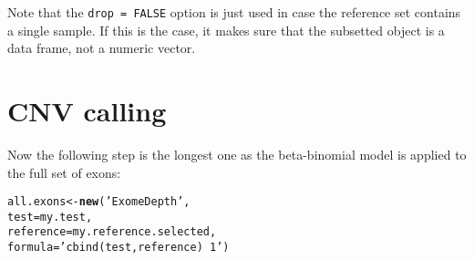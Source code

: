 \documentclass[10pt]{article}\usepackage[]{graphicx}\usepackage[]{color}
\makeatletter
\newcommand{\hlstr}[1]{\textcolor[rgb]{0.192,0.494,0.8}{#1}}%
\newcommand{\hlstd}[1]{\textcolor[rgb]{0.345,0.345,0.345}{#1}}%
\newcommand{\hlkwb}[1]{\textcolor[rgb]{0.69,0.353,0.396}{#1}}%
\newcommand{\hlkwc}[1]{\textcolor[rgb]{0.333,0.667,0.333}{#1}}%
\newcommand{\hlkwd}[1]{\textcolor[rgb]{0.737,0.353,0.396}{\textbf{#1}}}%
\newenvironment{kframe}{%
 \def\at@end@of@kframe{}%
 \ifinner\ifhmode%
  \def\at@end@of@kframe{\end{minipage}}%
  \begin{minipage}{\columnwidth}%
 \fi\fi%
 \def\FrameCommand##1{\hskip\@totalleftmargin \hskip-\fboxsep
 \colorbox{shadecolor}{##1}\hskip-\fboxsep
     \hskip-\linewidth \hskip-\@totalleftmargin \hskip\columnwidth}%
 \MakeFramed {\advance\hsize-\width
   \@totalleftmargin\z@ \linewidth\hsize
   \@setminipage}}%
 {\par\unskip\endMakeFramed%
 \at@end@of@kframe}
\newenvironment{knitrout}{}{} %
\makeatother
\begin{document}
Note that the \texttt{drop = FALSE} option is just used in case the reference set contains a single sample. 
If this is the case, it makes sure that the subsetted object is a data frame, not a numeric vector.

\section{CNV calling}
Now the following step is the longest one as the beta-binomial model is applied to the full set of exons:
\begin{knitrout}
\color{fgcolor}\begin{kframe}
\begin{alltt}
\hlstd{all.exons} \hlkwb{<-} \hlkwd{new}\hlstd{(}\hlstr{'ExomeDepth'}\hlstd{,}
                 \hlkwc{test} \hlstd{= my.test,}
                 \hlkwc{reference} \hlstd{= my.reference.selected,}
                 \hlkwc{formula} \hlstd{=} \hlstr{'cbind(test, reference) ~ 1'}\hlstd{)}
\end{alltt}


{\ttfamily\noindent\itshape\color{messagecolor}{\#\# Now fitting the beta-binomial model on a data frame with 26547 rows : this step can take a few minutes.}}

{\ttfamily\noindent\color{warningcolor}{\#\# Warning in aod::betabin(data = data.for.fit, formula = as.formula(formula), : The data set contains at least one line with weight = 0.}}

{\ttfamily\noindent\itshape\color{messagecolor}{\#\# Now computing the likelihood for the different copy number states}}\end{kframe}
\end{knitrout}
\end{document}
